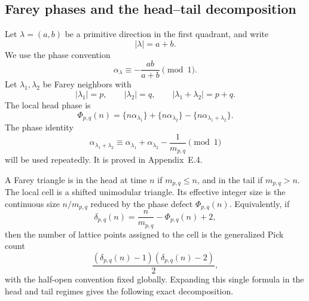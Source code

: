 \documentclass[a4paper,american,11pt]{amsart}
\theoremstyle{plain}
\theoremstyle{definition}
\begin{document}
\subsection{Farey phases and the head--tail decomposition}

Let \(\lambda=(a,b)\) be a primitive direction in the first quadrant, and write
\[
|\lambda|=a+b.
\]
We use the phase convention
\begin{equation}\label{eq:alpha}
\alpha_\lambda\equiv -\frac{ab}{a+b}\pmod 1.
\end{equation}
Let \(\lambda_1,\lambda_2\) be Farey neighbors with
\[
|\lambda_1|=p,
\qquad
|\lambda_2|=q,
\qquad
|\lambda_1+\lambda_2|=p+q.
\]
The local head phase is
\begin{equation}\label{eq:phi}
\Phi_{p,q}(n)
=
\{n\alpha_{\lambda_1}\}
+
\{n\alpha_{\lambda_2}\}
-
\{n\alpha_{\lambda_1+\lambda_2}\}.
\end{equation}
The phase identity
\begin{equation}\label{eq:phaseID}
\alpha_{\lambda_1+\lambda_2}
\equiv
\alpha_{\lambda_1}+\alpha_{\lambda_2}
-\frac{1}{m_{p,q}}
\pmod 1
\end{equation}
will be used repeatedly. It is proved in Appendix~E.4.

A Farey triangle is in the head at time \(n\) if \(m_{p,q}\le n\), and in the
tail if \(m_{p,q}>n\). The local cell is a shifted unimodular triangle. Its
effective integer size is the continuous size \(n/m_{p,q}\) reduced by the
phase defect \(\Phi_{p,q}(n)\). Equivalently, if
\[
\delta_{p,q}(n)
=
\frac{n}{m_{p,q}}-\Phi_{p,q}(n)+2,
\]
then the number of lattice points assigned to the cell is the generalized Pick
count
\[
\frac{(\delta_{p,q}(n)-1)(\delta_{p,q}(n)-2)}2,
\]
with the half-open convention fixed globally. Expanding this single formula
in the head and tail regimes gives the following exact decomposition.
\end{document}
